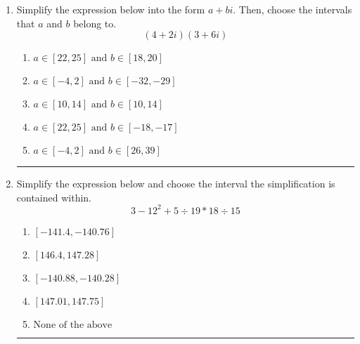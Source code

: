 \documentclass[14pt]{extbook}
\newcommand{\litem}[1]{\item#1\hspace*{-1cm}\rule{\textwidth}{0.4pt}}
\begin{document}
\begin{enumerate}
{\begin{enumerate}[label=\Alph*.]
\end{enumerate} }
\litem{
Simplify the expression below into the form $a+bi$. Then, choose the intervals that $a$ and $b$ belong to.\[ (4 + 2 i)(3 + 6 i) \]\begin{enumerate}[label=\Alph*.]
\item \( a \in [22, 25] \text{ and } b \in [18, 20] \)
\item \( a \in [-4, 2] \text{ and } b \in [-32, -29] \)
\item \( a \in [10, 14] \text{ and } b \in [10, 14] \)
\item \( a \in [22, 25] \text{ and } b \in [-18, -17] \)
\item \( a \in [-4, 2] \text{ and } b \in [26, 39] \)

\end{enumerate} }
\litem{
Simplify the expression below and choose the interval the simplification is contained within.\[ 3 - 12^2 + 5 \div 19 * 18 \div 15 \]\begin{enumerate}[label=\Alph*.]
\item \( [-141.4, -140.76] \)
\item \( [146.4, 147.28] \)
\item \( [-140.88, -140.28] \)
\item \( [147.01, 147.75] \)
\item \( \text{None of the above} \)

\end{enumerate} }
\end{enumerate}
\end{document}
